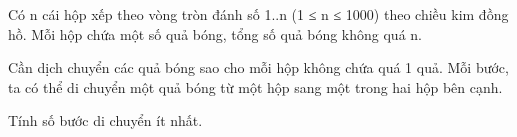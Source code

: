 Có n cái hộp xếp theo vòng tròn đánh số 1..n (1 ≤ n ≤ 1000) theo chiều kim đồng hồ. Mỗi hộp chứa một số quả bóng, tổng số quả bóng không quá n.  

   Cần dịch chuyển các quả bóng sao cho mỗi hộp không chứa quá 1 quả. Mỗi bước, ta có thể di chuyển một quả bóng từ một hộp sang một trong hai hộp bên cạnh.  

   Tính số bước di chuyển ít nhất.